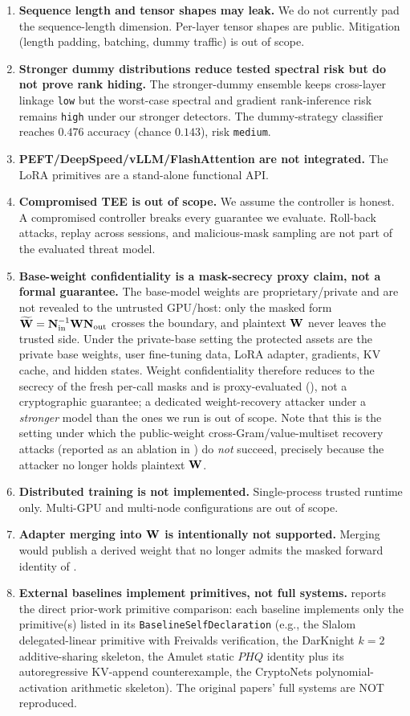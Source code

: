 \begin{enumerate}[leftmargin=*, nosep]
  \item \textbf{Sequence length and tensor shapes may leak.} We do not currently pad the sequence-length dimension. Per-layer tensor shapes are public. Mitigation (length padding, batching, dummy traffic) is out of scope.
  \item \textbf{Stronger dummy distributions reduce tested spectral risk but do not prove rank hiding.} The stronger-dummy ensemble keeps cross-layer linkage \texttt{low} but the worst-case spectral and gradient rank-inference risk remains \texttt{high} under our stronger detectors. The dummy-strategy classifier reaches $0.476$ accuracy (chance $0.143$), risk \texttt{medium}.
  \item \textbf{PEFT/DeepSpeed/vLLM/FlashAttention are not integrated.} The LoRA primitives are a stand-alone functional API.
  \item \textbf{Compromised TEE is out of scope.} We assume the controller is honest. A compromised controller breaks every guarantee we evaluate. Roll-back attacks, replay across sessions, and malicious-mask sampling are not part of the evaluated threat model.
  \item \textbf{Base-weight confidentiality is a mask-secrecy proxy claim, not a formal guarantee.} The base-model weights are proprietary/private and are not revealed to the untrusted GPU/host: only the masked form $\widetilde{\mathbf{W}} = \mathbf{N}_{\mathrm{in}}^{-1}\mathbf{W}\mathbf{N}_{\mathrm{out}}$ crosses the boundary, and plaintext $\mathbf{W}$ never leaves the trusted side. Under the private-base setting the protected assets are the private base weights, user fine-tuning data, LoRA adapter, gradients, KV cache, and hidden states. Weight confidentiality therefore reduces to the secrecy of the fresh per-call masks and is proxy-evaluated (), not a cryptographic guarantee; a dedicated weight-recovery attacker under a \emph{stronger} model than the ones we run is out of scope. Note that this is the setting under which the public-weight cross-Gram/value-multiset recovery attacks (reported as an ablation in ) do \emph{not} succeed, precisely because the attacker no longer holds plaintext $\mathbf{W}$.
  \item \textbf{Distributed training is not implemented.} Single-process trusted runtime only. Multi-GPU and multi-node configurations are out of scope.
  \item \textbf{Adapter merging into $\mathbf{W}$ is intentionally not supported.} Merging would publish a derived weight that no longer admits the masked forward identity of .
  \item \textbf{External baselines implement primitives, not full systems.}  reports the direct prior-work primitive comparison: each baseline implements only the primitive(s) listed in its \texttt{BaselineSelfDeclaration} (e.g., the Slalom delegated-linear primitive with Freivalds verification, the DarKnight $k=2$ additive-sharing skeleton, the Amulet static $P H Q$ identity plus its autoregressive KV-append counterexample, the CryptoNets polynomial-activation arithmetic skeleton). The original papers' full systems are NOT reproduced.

\end{enumerate}
